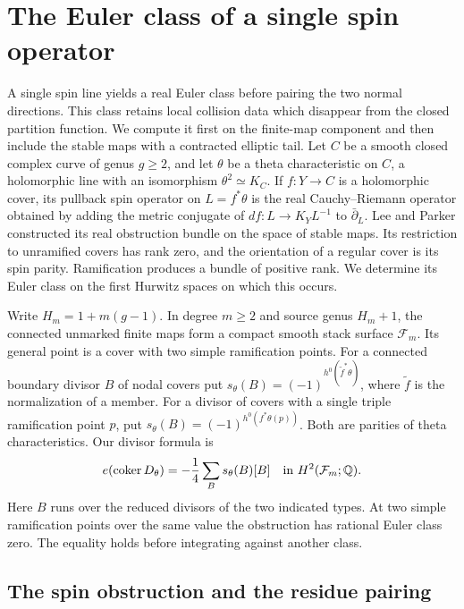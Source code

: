\section{The Euler class of a single spin operator}\label{sec:spin-residues}
A single spin line yields a real Euler class before pairing the two normal directions. This class retains local collision data which disappear from the closed partition function. We compute it first on the finite-map component and then include the stable maps with a contracted elliptic tail.
Let $C$ be a smooth closed complex curve of genus $g\ge2$, and let
$\theta$ be a theta characteristic on $C$, a holomorphic line with an
isomorphism $\theta^2\simeq K_C$. If $f:Y\to C$ is a holomorphic
cover, its pullback spin operator on $L=f^*\theta$ is the real
Cauchy--Riemann operator obtained by adding the metric conjugate of
$df:L\to K_YL^{-1}$ to $\bar\partial_L$. Lee and Parker
\cite{lpob} constructed its real obstruction bundle on the space of
stable maps. Its restriction to unramified covers has rank zero, and
the orientation of a regular cover is its spin parity. Ramification
produces a bundle of positive rank. We determine its Euler class on
the first Hurwitz spaces on which this occurs.

Write $H_m=1+m(g-1)$. In degree $m\ge2$ and source genus $H_m+1$, the
connected unmarked finite maps form a compact smooth stack surface
$\mathcal F_m$. Its general point is a cover with two simple
ramification points. For a connected boundary divisor $B$ of nodal
covers put $s_\theta(B)=(-1)^{h^0(\widetilde f^*\theta)}$, where
$\widetilde f$ is the normalization of a member. For a divisor of
covers with a single triple ramification point $p$, put
$s_\theta(B)=(-1)^{h^0(f^*\theta(p))}$. Both are parities of theta
characteristics. Our divisor formula is
\begin{equation}\label{p8-eq:intro-divisor}
       e(\operatorname{coker}D_\theta)
          =-\frac14\sum_{B} s_\theta(B)[B]
             \quad\text{in }H^2(\mathcal F_m;\mathbb Q).
\end{equation}
Here $B$ runs over the reduced divisors of the two indicated types.
At two simple ramification points over the same value the obstruction
has rational Euler class zero. The equality holds before integrating
against another class.

\subsection{The spin obstruction and the residue pairing}\label{p8-sec:residue}

